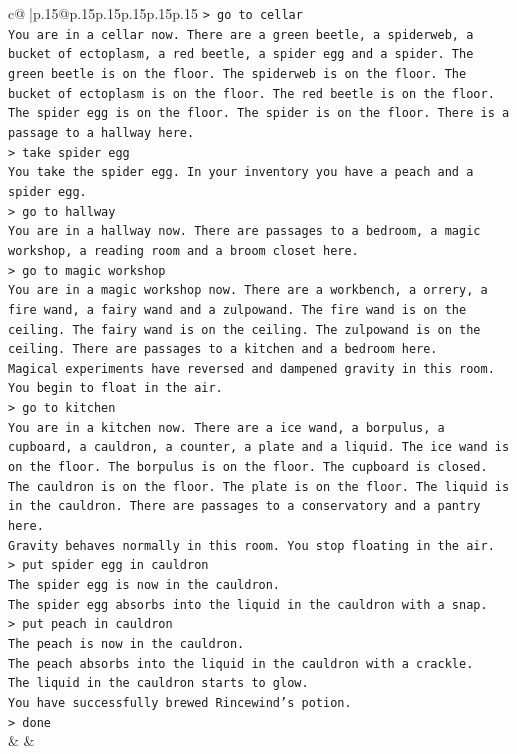 \documentclass{article}
\begin{document}
{\begin{supertabular}{c@{$\;$}|p{.15\linewidth}@{}p{.15\linewidth}p{.15\linewidth}p{.15\linewidth}p{.15\linewidth}p{.15\linewidth}}
{{{\texttt{> go to cellar} \\
\texttt{You are in a cellar now. There are a green beetle, a spiderweb, a bucket of ectoplasm, a red beetle, a spider egg and a spider. The green beetle is on the floor. The spiderweb is on the floor. The bucket of ectoplasm is on the floor. The red beetle is on the floor. The spider egg is on the floor. The spider is on the floor. There is a passage to a hallway here.} \\
\texttt{> take spider egg} \\
\texttt{You take the spider egg. In your inventory you have a peach and a spider egg.} \\
\texttt{> go to hallway} \\
\texttt{You are in a hallway now. There are passages to a bedroom, a magic workshop, a reading room and a broom closet here.} \\
\texttt{> go to magic workshop} \\
\texttt{You are in a magic workshop now. There are a workbench, a orrery, a fire wand, a fairy wand and a zulpowand. The fire wand is on the ceiling. The fairy wand is on the ceiling. The zulpowand is on the ceiling. There are passages to a kitchen and a bedroom here.} \\
\texttt{Magical experiments have reversed and dampened gravity in this room. You begin to float in the air.} \\
\texttt{> go to kitchen} \\
\texttt{You are in a kitchen now. There are a ice wand, a borpulus, a cupboard, a cauldron, a counter, a plate and a liquid. The ice wand is on the floor. The borpulus is on the floor. The cupboard is closed. The cauldron is on the floor. The plate is on the floor. The liquid is in the cauldron. There are passages to a conservatory and a pantry here.} \\
\texttt{Gravity behaves normally in this room. You stop floating in the air.} \\
\texttt{> put spider egg in cauldron} \\
\texttt{The spider egg is now in the cauldron.} \\
\texttt{The spider egg absorbs into the liquid in the cauldron with a snap.} \\
\texttt{> put peach in cauldron} \\
\texttt{The peach is now in the cauldron.} \\
\texttt{The peach absorbs into the liquid in the cauldron with a crackle.} \\
\texttt{The liquid in the cauldron starts to glow.} \\
\texttt{You have successfully brewed Rincewind's potion.} \\
\texttt{> done} \\
            }
        }
    }
    & & \\ \\


\end{supertabular}}
\end{document}
